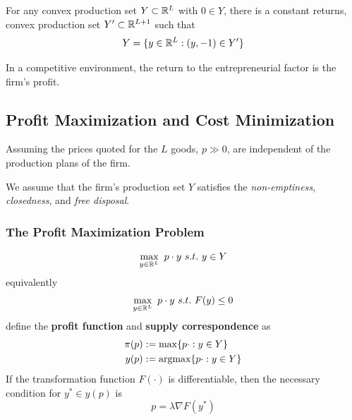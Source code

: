 \documentclass{article}
\begin{document}
	 		\begin{proposition}
	 			For any convex production set $Y \subset \mathbb{R}^L$ with $0 \in Y$, there is a constant returns, convex production set $Y' \subset \mathbb{R}^{L+1}$ such that
	 			\begin{equation}
	 				Y = \{y \in \mathbb{R}^L: (y, -1) \in Y'\}
	 			\end{equation}
	 		\end{proposition}
	 		
	 		\begin{remark}
	 			In a competitive environment, the return to the entrepreneurial factor is the firm's profit.
	 		\end{remark}

	 	\subsection{Profit Maximization and Cost Minimization}
	 		\begin{assumption}
	 			Assuming the prices quoted for the $L$ goods, $p \gg 0$, are independent of the production plans of the firm.
	 		\end{assumption}
	 		
	 		\begin{assumption}
	 			We assume that the firm's production set $Y$ satisfies the \emph{non-emptiness}, \emph{closedness}, and \emph{free disposal}.
	 		\end{assumption}
	 		
	 		\subsubsection{The Profit Maximization Problem}
	 		\begin{definition}[PMP]
	 			\begin{gather}
	 				\max_{y \in \mathbb{R}^L}\ p \cdot y\ s.t.\ y \in Y
	 			\end{gather}
	 			equivalently
	 			\begin{gather}
	 				\max_{y \in \mathbb{R}^L}\ p \cdot y\ s.t.\ F(y) \leq 0
	 			\end{gather}
	 			define the \textbf{profit function} and \textbf{supply correspondence} as 
	 			\begin{align}
	 				\pi(p) &:= \max\{p \cdot : y \in Y\} \\
	 				y(p) &:= \operatorname*{argmax}\{p \cdot : y \in Y\}
	 			\end{align}
	 			If the transformation function $F(\cdot)$ is differentiable, then the necessary condition for $y^* \in y(p)$ is
	 			\begin{equation}
	 				p = \lambda \nabla F (y^*)
	 			\end{equation}
	 		\end{definition}
	 		
\end{document}
